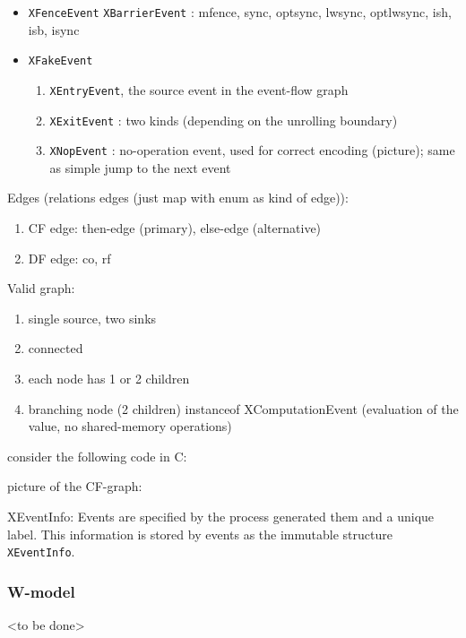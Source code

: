 \begin{itemize}
  \item \texttt{XFenceEvent}
    \texttt{XBarrierEvent} : mfence, sync, optsync, lwsync, optlwsync, ish, isb, isync
    
  \item \texttt{XFakeEvent}
    \begin{enumerate}
    \item \texttt{XEntryEvent}, the source event in the event-flow graph %
    \item \texttt{XExitEvent} : two kinds (depending on the unrolling boundary)
    \item \texttt{XNopEvent} : no-operation event, used for correct encoding (picture); same as simple jump to the next event
    \end{enumerate}
    
\end{itemize}

Edges (relations edges (just map with enum as kind of edge)):
\begin{enumerate}
\item CF edge: then-edge (primary), else-edge (alternative)
\item DF edge: co, rf
\end{enumerate}

Valid graph:
\begin{enumerate}
\item single source, two sinks
\item connected
\item each node has 1 or 2 children
\item branching node (2 children) instanceof XComputationEvent (evaluation of the value, no shared-memory operations)
\end{enumerate}

consider the following code in C:

picture of the CF-graph:

XEventInfo:
Events are specified by the process generated them and a unique label.
This information is stored by events as the immutable structure \texttt{XEventInfo}.

%

\subsubsection{W-model}
\label{ch:impl:model:wmodel}
<to be done>

